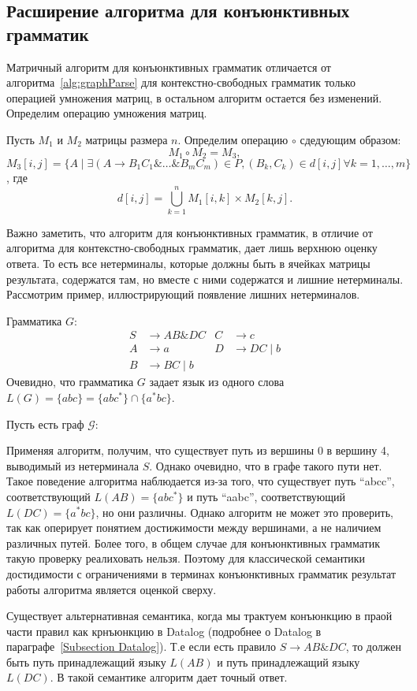 \subsection{Расширение алгоритма для конъюнктивных грамматик}

Матричный алгоритм для конъюнктивных грамматик отличается от алгоритма~\ref{alg:graphParse} для контекстно-свободных грамматик только операцией умножения матриц, в остальном алгоритм остается без изменений. Определим операцию умножения матриц.
\begin{definition}
    Пусть $M_1$ и $M_2$ матрицы размера $n$. Определим операцию $\circ$  сдедующим образом:
     $$M_1 \circ M_2 = M_3,$$ $$M_3 [i,j] = \{A \mid \exists (A \rightarrow B_1 C_1 \& \ldots \& B_m C_m) \in P, (B_k , C_k) \in d[i,j] \forall k = 1,\ldots,m\}$$, где $$d[i,j] = \bigcup_{k = 1}^{n} M_1 [i,k] \times M_2 [k,j].$$
\end{definition}

Важно заметить, что алгоритм для конъюнктивных грамматик, в отличие от алгоритма для контекстно-свободных грамматик, дает лишь верхнюю оценку ответа. То есть все нетерминалы, которые должны быть в ячейках матрицы результата, содержатся там, но вместе с ними содержатся и лишние нетерминалы. Рассмотрим пример, иллюстрирующий появление лишних нетерминалов.

\begin{example}
    Грамматика $G$:
    \begin{align*}
    S &\to AB \& DC & C &\to c \\
    A &\to a        & D &\to DC \mid b\\
    B &\to BC \mid b
    \end{align*}
    Очевидно, что грамматика $G$ задает язык из одного слова $L(G) = \{abc\} = \{abc^*\} \cap \{a^* bc\}$.

    Пусть есть граф $\mathcal{G}$:
    \begin{center}
      
    \end{center}
    Применяя алгоритм, получим, что существует путь из вершины 0 в вершину 4, выводимый из нетерминала $S$. Однако очевидно, что в графе такого пути нет.
    Такое поведение алгоритма наблюдается из-за того, что существует путь ``abcc'', соответствующий $L(AB) = \{abc^*\}$ и путь ``aabc'', соответствующий $L(DC) = \{a^{*}bc\}$, но они различны. Однако алгоритм не может это проверить, так как оперирует понятием достижимости между вершинами, а не наличием различных путей. Более того, в общем случае для конъюнктивных грамматик такую проверку реалиховать нельзя. Поэтому для классической семантики достидимости с ограничениями в терминах конъюнктивных грамматик результат работы алгоритма является оценкой сверху.

    Существует альтернативная семантика, когда мы трактуем конъюнкцию в праой части правил как крнъюнкцию в Datalog (подробнее о Datalog в параграфе~\ref{Subsection Datalog}). Т.е если есть правило $S \to AB \& DC$, то должен быть путь принадлежащий языку $L(AB)$ и путь принадлежащий языку $L(DC)$. В такой семантике алгоритм дает точный ответ.
\end{example}

